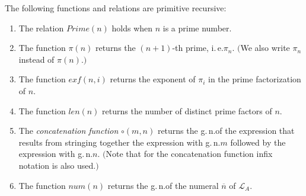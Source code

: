 \begin{lem} \label{lem:num}
The following functions and relations are primitive recursive:
\begin{enumerate}
\item The relation $\mathit{Prime}(n)$ holds when $n$ is a prime number.
\item The function $\pi(n)$ returns the $(n+1)$-th prime, i.\,e.\@ $\pi_{n}$. $($We also write $\pi_n$ instead of $\pi(n)$.$)$ 
\item The function $\mathit{exf}(n,i)$ returns the exponent of $\pi_i$ in the prime factorization of $n$.
\item The function $\mathit{len} (n)$ returns the number of distinct prime factors of $n$.
\item The \textit{concatenation function} $\circ (m,n)$ returns the g.\,n.\@ of the expression that results from stringing together the expression with g.\,n.\@ $m$ followed by the expression with g.\,n.\@ $n$. $($Note that for the concatenation function infix notation is also used.$)$
\item The function $\mathit{num}(n)$ returns the g.\,n.\@ of the numeral $\overline{n}$ of $\mathcal{L}_A$.
\end{enumerate}
\end{lem}

